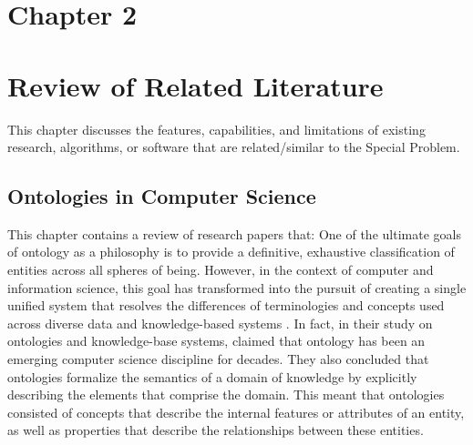 \section*{Chapter 2}
\section{Review of Related Literature}
This chapter discusses the features, capabilities, and limitations of existing research, algorithms, or software that are related/similar to the Special Problem.
\subsection{Ontologies in Computer Science}
This chapter  contains a review of research papers that:
One of the ultimate goals of ontology as a philosophy is to provide a definitive, exhaustive classification of entities across all spheres of being. However, in the context of computer and information science, this goal has transformed into the pursuit of creating a single unified system that resolves the differences of terminologies and concepts used across diverse data and knowledge-based systems \cite{smith2012ontology}. In fact, in their study on ontologies and knowledge-base systems,  claimed that ontology has been an emerging computer science discipline for decades. They also concluded that ontologies formalize the semantics of a domain of knowledge by explicitly describing the elements that comprise the domain. This meant that ontologies consisted of concepts that describe the internal features or attributes of an entity, as well as properties that describe the relationships between these entities. 

